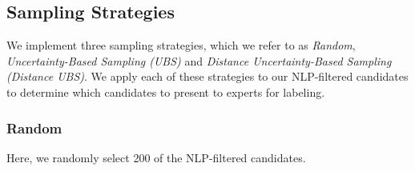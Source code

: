 
\subsection{Sampling Strategies}\label{sec:sampling}
We implement three sampling strategies, which we refer to as \textit{Random}, \textit{Uncertainty-Based Sampling (UBS)} and \textit{Distance Uncertainty-Based Sampling (Distance UBS)}.
We apply each of these strategies to our NLP-filtered candidates to determine which candidates to present to experts for labeling.

\subsubsection{Random}
Here, we randomly select 200 of the NLP-filtered candidates.

